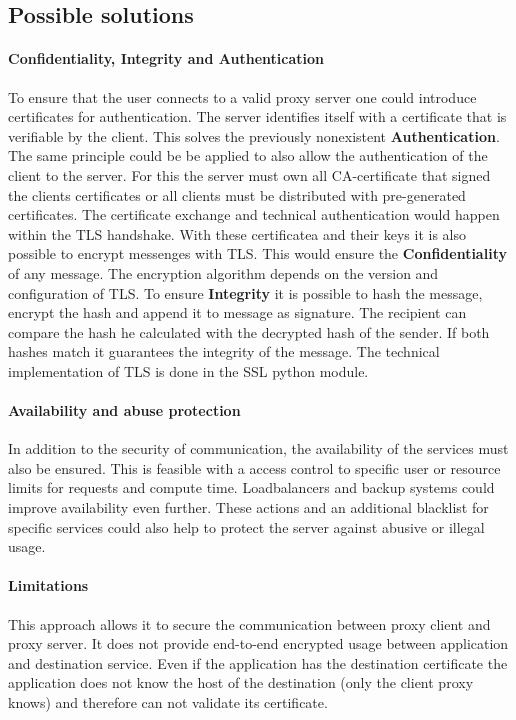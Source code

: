 \documentclass[12pt, a4paper]{scrartcl}
\begin{document}
\subsection{Possible solutions}
\paragraph{Confidentiality, Integrity and Authentication}
To ensure that the user connects to a valid proxy server one could introduce certificates for authentication. The server identifies itself with a certificate that is verifiable by the client. This solves the previously nonexistent \textbf{Authentication}. The same principle could be be applied to also allow the authentication of the client to the server. For this the server must own all CA-certificate that signed the clients certificates or all clients must be distributed with pre-generated certificates.\newline
The certificate exchange and technical authentication would happen within the \ac{TLS} handshake. With these certificatea and their keys it is also possible to encrypt messenges with \ac{TLS}. This would ensure the \textbf{Confidentiality} of any message. The encryption algorithm depends on the version and configuration of \ac{TLS}.\newline
To ensure \textbf{Integrity} it is possible to hash the message, encrypt the hash and append it to message as signature. The recipient can compare the hash he calculated with the decrypted hash of the sender. If both hashes match it guarantees the integrity of the message.\newline
The technical implementation of \ac{TLS} is done in the \ac{SSL} python module.
\paragraph{Availability and abuse protection}
In addition to the security of communication, the availability of the services must also be ensured. This is feasible with a access control to specific user or resource limits for requests and compute time. Loadbalancers and backup systems could improve availability even further.\newline
These actions and an additional blacklist for specific services could also help to protect the server against abusive or illegal usage.
\paragraph{Limitations}
This approach allows it to secure the communication between proxy client and proxy server. It does not provide end-to-end encrypted usage between application and destination service. Even if the application has the destination certificate the application does not know the host of the destination (only the client proxy knows) and therefore can not validate its certificate.
\end{document}
